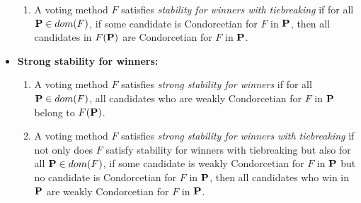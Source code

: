 \begin{definition}
\begin{itemize}
\begin{enumerate}
            \item A voting method $F$ satisfies \emph{stability for winners with tiebreaking} if for all $\mathbf{P} \in dom(F)$, if some candidate is Condorcetian for $F$ in $\mathbf{P}$, then all candidates in $F (\mathbf{P})$ are Condorcetian for $F$ in $\mathbf{P}$.
        \end{enumerate}
        \item \textbf{Strong stability for winners:}
        \begin{enumerate}
            \item A voting method $F$ satisfies \emph{strong stability for winners} if for all $\mathbf{P} \in dom(F)$, all candidates who are weakly Condorcetian for $F$ in $\mathbf{P}$ belong to $F(\mathbf{P})$.
            \item A voting method $F$ satisfies \emph{strong stability for winners with tiebreaking} if not only does $F$ satisfy stability for winners with tiebreaking but also for all $\mathbf{P} \in dom(F)$, if some candidate is weakly Condorcetian for $F$ in $\mathbf{P}$ but no candidate is Condorcetian for $F$ in $\mathbf{P}$, then all candidates who win in $\mathbf{P}$ are weakly Condorcetian for $F$ in $\mathbf{P}$.
        \end{enumerate}
    \end{itemize}
\end{definition}